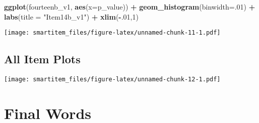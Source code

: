 \documentclass[]{book}
\newenvironment{Shaded}{\begin{snugshade}}{\end{snugshade}}
\newcommand{\KeywordTok}[1]{\textcolor[rgb]{0.13,0.29,0.53}{\textbf{#1}}}
\newcommand{\DataTypeTok}[1]{\textcolor[rgb]{0.13,0.29,0.53}{#1}}
\newcommand{\DecValTok}[1]{\textcolor[rgb]{0.00,0.00,0.81}{#1}}
\newcommand{\StringTok}[1]{\textcolor[rgb]{0.31,0.60,0.02}{#1}}
\newcommand{\OperatorTok}[1]{\textcolor[rgb]{0.81,0.36,0.00}{\textbf{#1}}}
\newcommand{\NormalTok}[1]{#1}
\theoremstyle{definition}
\theoremstyle{definition}
\theoremstyle{definition}
\theoremstyle{remark}
\begin{document}
\begin{Shaded}
\begin{Highlighting}[]
\KeywordTok{ggplot}\NormalTok{(fourteenb_v1, }\KeywordTok{aes}\NormalTok{(}\DataTypeTok{x=}\NormalTok{p_value)) }\OperatorTok{+}\StringTok{ }\KeywordTok{geom_histogram}\NormalTok{(}\DataTypeTok{binwidth=}\NormalTok{.}\DecValTok{01}\NormalTok{) }\OperatorTok{+}\StringTok{ }\KeywordTok{labs}\NormalTok{(}\DataTypeTok{title =} \StringTok{"Item14b_v1"}\NormalTok{) }\OperatorTok{+}\StringTok{ }\KeywordTok{xlim}\NormalTok{(}\OperatorTok{-}\NormalTok{.}\DecValTok{01}\NormalTok{,}\DecValTok{1}\NormalTok{)}
\end{Highlighting}
\end{Shaded}

\texttt{[image: smartitem\_files/figure-latex/unnamed-chunk-11-1.pdf]}

\section{All Item Plots}\label{all-item-plots}

\begin{Shaded}
\end{Shaded}

\texttt{[image: smartitem\_files/figure-latex/unnamed-chunk-12-1.pdf]}

\chapter{Final Words}\label{final-words}
\end{document}
